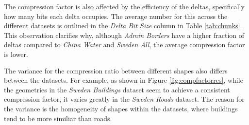 \begin{table}[htbp]
\centering
\caption{Chunking statistics based on an average of 100 000 random samples with a maximum chunk size of 13 deltas.} 


\label{tab:dataset_stats_chunking}
\label{tab:chunks}
\end{table}

The compression factor is also affected by the efficiency of the deltas, specifically how many bits each delta occupies. The average number for this across the different datasets is outlined in the \textit{Delta Bit Size} column in Table \ref{tab:chunks}. This observation clarifies why, although \textit{Admin Borders} have a higher fraction of deltas compared to \textit{China Water} and \textit{Sweden All}, the average compression factor is lower.

The variance for the compression ratio between different shapes also differs between the datasets. For example, as shown in Figure \ref{fig:compfactorres}, while the geometries in the \textit{Sweden Buildings} dataset seem to achieve a consistent compression factor, it varies greatly in the \textit{Sweden Roads} dataset. The reason for the variance is the homogeneity of shapes within the datasets, where buildings tend to be more similiar than roads.







